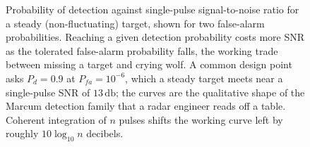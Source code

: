 \begin{figure}[htbp]
\centering
{}
\caption[Detection probability versus SNR]{Probability of detection against
single-pulse signal-to-noise ratio for a steady (non-fluctuating) target, shown
for two false-alarm probabilities. Reaching a given detection probability costs
more SNR as the tolerated false-alarm probability falls, the working trade
between missing a target and crying wolf. A common design point asks
$P_d = 0.9$ at $P_{fa} = 10^{-6}$, which a steady target meets near a
single-pulse SNR of $13\,\si{\decibel}$; the curves are the qualitative shape of
the Marcum detection family that a radar engineer reads off a table. Coherent
integration of $n$ pulses shifts the working curve left by roughly
$10\log_{10} n$ decibels.}
\label{fig:vol04ch10:detection-curve}
\end{figure}

